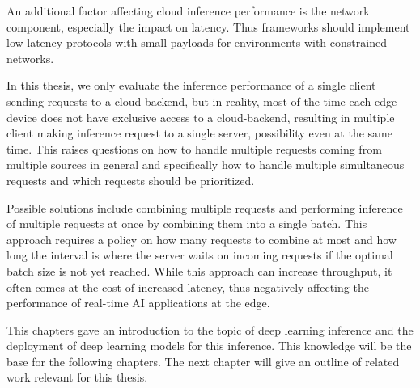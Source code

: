 An additional factor affecting cloud inference performance is the network component, especially the impact on latency.
Thus frameworks should implement low latency protocols with small payloads for environments with constrained networks.

In this thesis, we only evaluate the inference performance of a single client sending requests to a cloud-backend, but in reality, most of the time each edge device does not have exclusive access to a cloud-backend, resulting in multiple client making inference request to a single server, possibility even at the same time.
This raises questions on how to handle multiple requests coming from multiple sources in general and specifically how to handle multiple simultaneous requests and which requests should be prioritized.

Possible solutions include combining multiple requests and performing inference of multiple requests at once by combining them into a single batch.
This approach requires a policy on how many requests to combine at most and how long the interval is where the server waits on incoming requests if the optimal batch size is not yet reached. 
While this approach can increase throughput, it often comes at the cost of increased latency, thus negatively affecting the performance of real-time AI applications at the edge.


\vspace{0.5cm}
This chapters gave an introduction to the topic of deep learning inference and the deployment of deep learning models for this inference.
This knowledge will be the base for the following chapters.
The next chapter will give an outline of related work relevant for this thesis.


